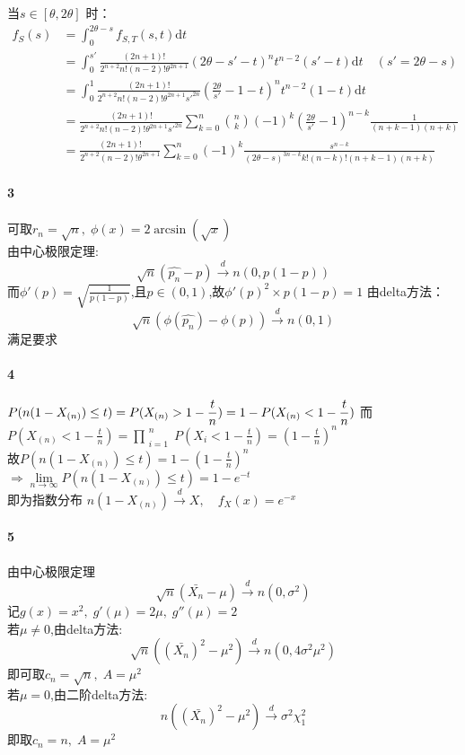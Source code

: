 \documentclass[11pt,a4paper]{ctexart}
\begin{document}
当\(s \in [\theta, 2\theta]\) 时：
\begin{equation*}
\begin{split}
f_S(s) & = \int_{0}^{2\theta - s}f_{S,T}(s,t)\mathrm{d}t \\
& = \int_{0}^{s'}\frac{(2n + 1)!}{2^{n + 2}n!(n - 2)!\theta^{2n + 1}}(2\theta - s' -t)^nt^{n - 2}(s' - t)\mathrm{d}t \quad (s' = 2\theta - s)\\
& = \int_{0}^{1}\frac{(2n + 1)!}{2^{n + 2}n!(n - 2)!\theta^{2n + 1}s'^{2n}}(\frac{2\theta}{s'} - 1 -t)^nt^{n - 2}(1 - t)\mathrm{d}t\\
& = \frac{(2n + 1)!}{2^{n + 2}n!(n - 2)!\theta^{2n + 1}s'^{2n}}\sum_{k = 0}^{n}{n \choose k}(-1)^k(\frac{2\theta}{s'} - 1)^{n - k}\frac{1}{(n + k - 1)(n + k)}\\
& = \frac{(2n + 1)!}{2^{n + 2}(n - 2)!\theta^{2n + 1}}\sum_{k = 0}^{n}(-1)^k\frac{s^{n - k}}{(2\theta - s)^{3n - k}k!(n - k)!(n + k - 1)(n + k)}
\end{split}
\end{equation*}
\paragraph{3}
可取\(r_n = \sqrt{n} ,\; \phi(x) = 2\arcsin(\sqrt{x})\)\\
由中心极限定理:
\[ \sqrt{n}(\hat{p_n} - p) \overset{d}{\to} n(0,p(1 - p))\]
而$\phi'(p) = \sqrt{\frac{1}{p(1 - p)}}$,且$p \in (0 , 1)$,故\(\phi'(p)^2\times p(1 - p) = 1\) 由delta方法：
\[ \sqrt{n}(\phi(\hat{p_n}) - \phi(p)) \overset{d}{\to} n(0,1)\]
满足要求
\paragraph{4}
$\displaystyle
P(n(1 - X_{(n)}) \leq t)  = P(X_{(n)} > 1 - \frac{t}{n}) = 1 - P(X_{(n)} < 1 - \frac{t}{n})\\$
而$\displaystyle P(X_{(n)} < 1 - \frac{t}{n}) = \prod_{\substack{i = 1}}^{\substack{n}} P(X_i < 1 - \frac{t}{n}) = (1 - \frac{t}{n})^n $\\
故$\displaystyle P(n(1 - X_{(n)}) \leq t) = 1 - (1 - \frac{t}{n})^n $ \\
 \(\Rightarrow \lim\limits_{n\to \infty}P(n(1 - X_{(n)}) \leq t) = 1 - e^{-t}\)\\
 即为指数分布 $\displaystyle n(1 - X_{(n)}) \overset{d}{\to} X, \quad f_X(x) = e^{-x}$
 \paragraph{5}
 由中心极限定理 
 \[ \sqrt{n}(\bar{X_n} - \mu) \overset{d}{\to} n(0,\sigma^2)\]
 记\(g(x) = x^2 ,\;g'(\mu) = 2 \mu,\; g''(\mu) = 2\)\\
 若\( \mu \neq 0\),由delta方法:
 \[ \sqrt{n}((\bar{X_n})^2 - \mu^2) \overset{d}{\to} n(0,4\sigma^2\mu^2)\]
 即可取\(c_n = \sqrt{n},\;A = \mu^2\)\\
 若\(\mu = 0\),由二阶delta方法:
 \[n((\bar{X_n})^2 - \mu^2) \overset{d}{\to} \sigma^2\chi^2_1\]
 即取\(c_n = n ,\; A = \mu^2\)
\end{document}
